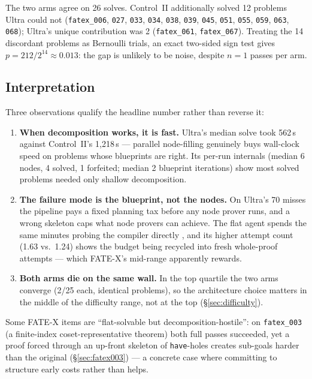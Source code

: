 \documentclass[12pt, a4paper]{article}
\newcommand{\run}[1]{\texttt{#1}}
\begin{document}
The two arms agree on 26 solves. Control~II additionally solved 12 problems
Ultra could not (\run{fatex\_006}, \run{027}, \run{033}, \run{034},
\run{038}, \run{039}, \run{045}, \run{051}, \run{055}, \run{059}, \run{063},
\run{068}); Ultra's unique contribution was 2 (\run{fatex\_061},
\run{fatex\_067}). Treating the 14 discordant problems as Bernoulli trials, an
exact two-sided sign test gives $p = 212/2^{14} \approx 0.013$: the gap is
unlikely to be noise, despite $n=1$ passes per arm.

\subsection{Interpretation}

Three observations qualify the headline number rather than reverse it:

\begin{enumerate}[itemsep=2pt]
\item \textbf{When decomposition works, it is fast.} Ultra's median solve took
      562\,s against Control~II's 1{,}218\,s --- parallel node-filling
      genuinely buys wall-clock speed on problems whose blueprints are right.
      Its per-run internals (median 6 nodes, 4 solved, 1 forfeited;
      median 2 blueprint iterations) show most solved problems needed only
      shallow decomposition.
\item \textbf{The failure mode is the blueprint, not the nodes.} On Ultra's
      70 misses the pipeline pays a fixed planning tax before any node prover
      runs, and a wrong skeleton caps what node provers can achieve. The flat
      agent spends the same minutes probing the compiler directly
      \cite{yao2023react}, and its higher attempt count (1.63 vs.\ 1.24)
      shows the budget being recycled into fresh whole-proof attempts ---
      which FATE-X's mid-range apparently rewards.
\item \textbf{Both arms die on the same wall.} In the top quartile the two
      arms converge (2/25 each, identical problems), so the architecture
      choice matters in the middle of the difficulty range, not at the top
      (\S\ref{sec:difficulty}).
\end{enumerate}

Some FATE-X items are ``flat-solvable but decomposition-hostile'': on
\run{fatex\_003} (a finite-index coset-representative theorem) both full passes
succeeded, yet a proof forced through an up-front skeleton of \texttt{have}-holes
creates sub-goals harder than the original (\S\ref{sec:fatex003}) --- a concrete
case where committing to structure early costs rather than helps.
\end{document}
